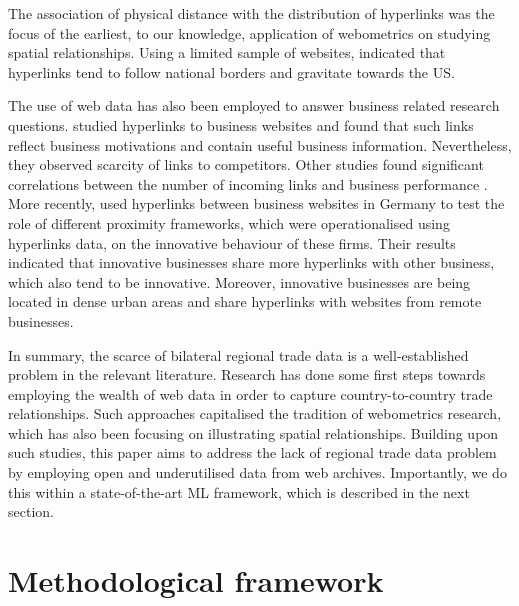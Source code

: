 \documentclass[]{interact}
\theoremstyle{plain}%
\theoremstyle{definition}
\theoremstyle{remark}
\begin{document}
The association of physical distance with the distribution of hyperlinks
was the focus of the earliest, to our knowledge, application of
webometrics on studying spatial relationships. Using a limited sample of
websites, \citet{halavais2000national} indicated that hyperlinks tend to
follow national borders and gravitate towards the US.

The use of web data has also been employed to answer business related
research questions. \citet{vaughan2006hyperlinks} studied hyperlinks to
business websites and found that such links reflect business motivations
and contain useful business information. Nevertheless, they observed
scarcity of links to competitors. Other studies found significant
correlations between the number of incoming links and business
performance \citep{vaughan2004exploring, vaughan2004links}. More
recently, \citet{kruger2020digital} used hyperlinks between business
websites in Germany to test the role of different proximity frameworks,
which were operationalised using hyperlinks data, on the innovative
behaviour of these firms. Their results indicated that innovative
businesses share more hyperlinks with other business, which also tend to
be innovative. Moreover, innovative businesses are being located in
dense urban areas and share hyperlinks with websites from remote
businesses.

In summary, the scarce of bilateral regional trade data is a
well-established problem in the relevant literature. Research has done
some first steps towards employing the wealth of web data in order to
capture country-to-country trade relationships. Such approaches
capitalised the tradition of webometrics research, which has also been
focusing on illustrating spatial relationships. Building upon such
studies, this paper aims to address the lack of regional trade data
problem by employing open and underutilised data from web archives.
Importantly, we do this within a state-of-the-art ML framework, which is
described in the next section.

\hypertarget{sec:3}{%
\section{Methodological framework}\label{sec:3}}
\end{document}
